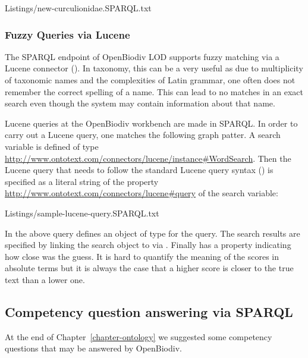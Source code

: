 
{Listings/new-curculionidae.SPARQL.txt}

\subsubsection{Fuzzy Queries via Lucene}

The SPARQL endpoint of OpenBiodiv LOD supports fuzzy matching via a Lucene connector (\cite{ontotext_graphdb_2018}). In taxonomy, this can be a very useful as due to multiplicity of taxonomic names and the complexities of Latin grammar, one often does not remember the correct spelling of a name. This can lead to no matches in an exact search even though the system may contain information about that name.

Lucene queries at the OpenBiodiv workbench are made in SPARQL. In order to carry out a Lucene query, one matches the following graph patter. A search variable is defined of type \url{http://www.ontotext.com/connectors/lucene/instance#WordSearch}. Then the Lucene query that needs to follow the standard Lucene query syntax (\cite{the_apache_software_foundation_apache_2013}) is specified as a literal string of the property \url{http://www.ontotext.com/connectors/lucene#query} of the search variable:


{ Listings/sample-lucene-query.SPARQL.txt}

In the above query  defines an object of type  for the query. The search results are specified by linking the search object to  via . Finally  has a  property indicating how close was the guess. It is hard to quantify the meaning of the scores in absolute terms but it is always the case that a higher score is closer to the true text than a lower one.

\subsection{Competency question answering via SPARQL}

At the end of Chapter~\ref{chapter-ontology} we suggested some competency questions that may be answered by OpenBiodiv.

